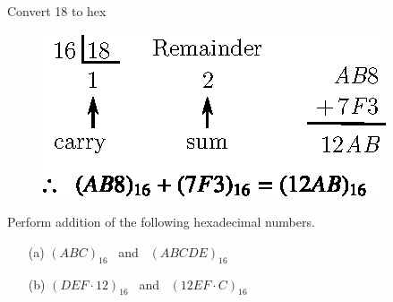 \begin{description}
Convert 18 to hex
\begin{figure}[H]
\centering
\includegraphics{chap6/fig36.eps}
\end{figure}
\end{description}

\begin{example}\label{exam6.14}
Perform addition of the following hexadecimal numbers.
\begin{itemize}
\item[(a)] $(ABC)_{16}$ \ and \ $(ABCDE)_{16}$

\item[(b)] $(DEF\cdot 12)_{16}$ \ and \ $(12EF\cdot C)_{16}$
\end{itemize}
\end{example}

